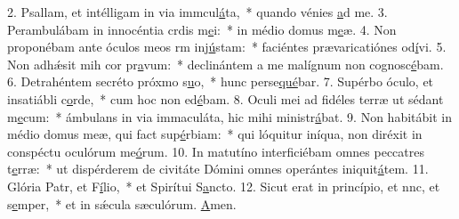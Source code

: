 2. Psallam, et intélligam in via immcul\uline{á}ta,~* quando vénies \uline{a}d me.
3. Perambulábam in innocéntia crdis m\uline{e}i:~* in médio domus m\uline{e}æ.
4. Non proponébam ante óculos meos rm inj\uline{ú}stam:~* faciéntes prævaricatiónes od\uline{í}vi.
5. Non adhǽsit mih cor pr\uline{a}vum:~* declinántem a me malígnum non cognosc\uline{é}bam.
6. Detrahéntem secréto próxmo s\uline{u}o,~* hunc perse\uline{qué}bar.
7. Supérbo óculo, et insatiábli c\uline{o}rde,~* cum hoc non ed\uline{é}bam.
8. Oculi mei ad fidéles terræ ut sédant m\uline{e}cum:~* ámbulans in via immaculáta, hic mihi ministr\uline{á}bat.
9. Non habitábit in médio domus meæ, qui fact sup\uline{é}rbiam:~* qui lóquitur iníqua, non diréxit in conspéctu oculórum me\uline{ó}rum.
10. In matutíno interficiébam omnes peccatres t\uline{e}rræ:~* ut dispérderem de civitáte Dómini omnes operántes iniquit\uline{á}tem.
11. Glória Patr, et F\uline{í}lio,~* et Spirítui S\uline{a}ncto.
12. Sicut erat in princípio, et nnc, et s\uline{e}mper,~* et in sǽcula sæculórum. \uline{A}men.
